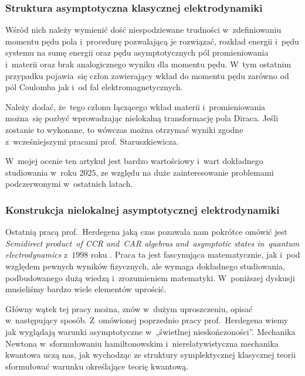\documentclass[10pt,t]{beamer}
\begin{document}
\begin{frame}
  \frametitle{Struktura asymptotyczna klasycznej elektrodynamiki}


  Wśród nich należy wymienić dość niespodziewane trudności w~zdefiniowaniu
  momentu pędu pola i~procedurę pozwalającą je rozwiązać, rozkład energii
  i~pędu systemu na sumę energii oraz pędu asymptotycznych pól
  promieniowania i~materii oraz brak analogicznego wyniku dla momentu pędu.
  W~tym ostatnim przypadku pojawia~się człon zawierający wkład do momentu
  pędu zarówno od pól Coulomba jak i~od fal elektromagnetycznych.

  Należy dodać, że~tego członu łączącego wkład materii i~promieniowania
  można~się pozbyć wprowadzając nielokalną transformację pola Diraca. Jeśli
  zostanie to wykonane, to wówczas można otrzymać wyniki zgodne
  z~wcześniejszymi pracami prof. Staruszkiewicza.

  W~mojej ocenie ten artykuł jest bardzo wartościowy i~wart dokładnego
  studiowania w~roku $2025$, ze względu na duże zainteresowanie problemami
  podczerwonymi w~ostatnich latach.

\end{frame}





\begin{frame}
  \frametitle{Konstrukcja nielokalnej asymptotycznej
    elektrodynamiki}


  Ostatnią pracą prof.~Herdegena jaką czas pozawala nam pokrótce omówić
  jest 
  {\textit{Semidirect product~of CCR and~CAR algebras and~asymptotic states
      in~quantum electrodynamics}} z~$1998$ roku
  \parencite{Herdegen-Semidirect-product-of-CCR-and-CAR-algebras-ETC-Pub-1998}.
  Praca ta jest fascynująca matematycznie,
  jak i~pod względem pewnych wyników fizycznych, ale wymaga dokładnego
  studiowania, podbudowanego dużą wiedzą i~zrozumieniem matematyki.
  W~poniższej dyskusji musieliśmy bardzo wiele elementów uprościć.

  Główny wątek tej pracy można, znów w~dużym uproszczeniu, opisać
  w~następujący sposób. Z~omówionej poprzednio pracy prof.~Herdegena
  wiemy jak wyglądają warunki asymptotyczne w~„świetlnej nieskończoności”.
  Mechanika Newtona w~sformułowaniu hamiltonowskim i~nierelatywistyczna
  mechanika kwantowa uczą nas, jak wychodząc ze struktury symplektycznej
  klasycznej teorii sformułować warunku określające teorię kwantową.

\end{frame}
\end{document}
